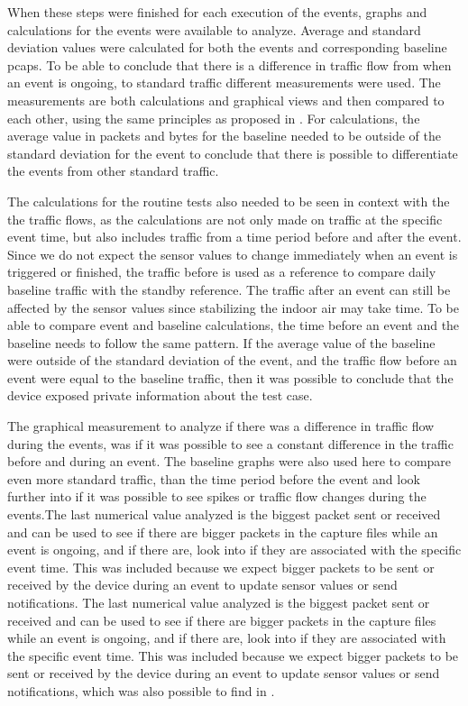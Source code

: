 When these steps were finished for each execution of the events, graphs and calculations for the events were available to analyze. Average and standard deviation values were calculated for both the events and corresponding baseline \gls{pcaps}. To be able to conclude that there is a difference in traffic flow from when an event is ongoing, to standard traffic different measurements were used. The measurements are both calculations and graphical views and then compared to each other, using the same principles as proposed in \cite{SpyingonSmartHomes}. For calculations, the average value in packets and bytes for the baseline needed to be outside of the standard deviation for the event to conclude that there is possible to differentiate the events from other standard traffic.

The calculations for the routine tests also needed to be seen in context with the the traffic flows, as the calculations are not only made on traffic at the specific event time, but also includes traffic from a time period before and after the event. Since we do not expect the sensor values to change immediately when an event is triggered or finished, the traffic before is used as a reference to compare daily baseline traffic with the standby reference. The traffic after an event can still be affected by the sensor values since stabilizing the indoor air may take time. To be able to compare event and baseline calculations, the time before an event and the baseline needs to follow the same pattern. If the average value of the baseline were outside of the standard deviation of the event, and the traffic flow before an event were equal to the baseline traffic, then it was possible to conclude that the device exposed private information about the test case. 

The graphical measurement to analyze if there was a difference in traffic flow during the events, was if it was possible to see a constant difference in the traffic before and during an event. The baseline graphs were also used here to compare even more standard traffic, than the time period before the event and look further into if it was possible to see spikes or traffic flow changes during the events.The last numerical value analyzed is the biggest packet sent or received and can be used to see if there are bigger packets in the capture files while an event is ongoing, and if there are, look into if they are associated with the specific event time. This was included because we expect bigger packets to be sent or received by the device during an event to update sensor values or send notifications. The last numerical value analyzed is the biggest packet sent or received and can be used to see if there are bigger packets in the capture files while an event is ongoing, and if there are, look into if they are associated with the specific event time. This was included because we expect bigger packets to be sent or received by the device during an event to update sensor values or send notifications, which was also possible to find in \cite{PassiveInferenceIoT}. 


